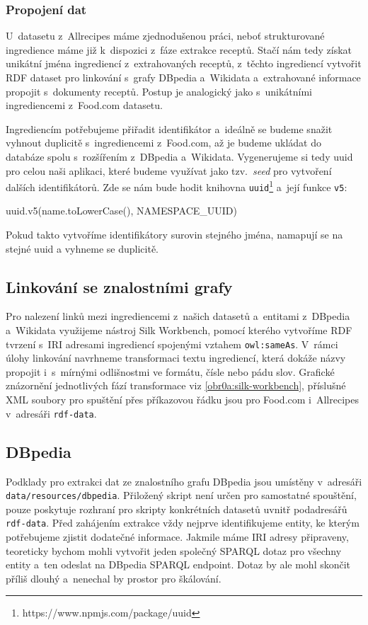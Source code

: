 \subsubsection{Propojení dat}

U~datasetu z~Allrecipes máme zjednodušenou práci, neboť strukturované ingredience máme již k~dispozici z~fáze extrakce receptů. Stačí nám tedy získat unikátní jména ingrediencí z~extrahovaných receptů, z~těchto ingrediencí vytvořit RDF dataset pro linkování s~grafy DBpedia a~Wikidata a~extrahované informace propojit s~dokumenty receptů. Postup je analogický jako s~unikátními ingrediencemi z~Food.com datasetu. 

Ingrediencím potřebujeme přiřadit identifikátor a~ideálně se budeme snažit vyhnout duplicitě s~ingrediencemi z~Food.com, až je budeme ukládat do databáze spolu s~rozšířením z~DBpedia a~Wikidata. Vygenerujeme si tedy uuid pro celou naši aplikaci, které budeme využívat jako tzv.~\emph{seed} pro vytvoření dalších identifikátorů. Zde se nám bude hodit knihovna \texttt{uuid}\footnote{https://www.npmjs.com/package/uuid} a~její funkce \texttt{v5}:
\begin{code}
uuid.v5(name.toLowerCase(), NAMESPACE_UUID)
\end{code}
Pokud takto vytvoříme identifikátory surovin stejného jména, namapují se na stejné uuid a vyhneme se duplicitě.

\subsection{Linkování se znalostními grafy}

Pro nalezení linků mezi ingrediencemi z~našich datasetů a~entitami z~DBpedia a~Wikidata využijeme nástroj Silk Workbench, pomocí kterého vytvoříme RDF tvrzení s~IRI adresami ingrediencí spojenými vztahem \texttt{owl:sameAs}. V~rámci úlohy linkování navrhneme transformaci textu ingrediencí, která dokáže názvy propojit i~s~mírnými odlišnostmi ve formátu, čísle nebo pádu slov. Grafické znázornění jednotlivých fází transformace viz \ref{obr0a:silk-workbench}, příslušné XML soubory pro spuštění přes příkazovou řádku jsou pro Food.com i~Allrecipes v~adresáři \texttt{rdf-data}.

\subsection{DBpedia}

Podklady pro extrakci dat ze znalostního grafu DBpedia jsou umístěny v~adresáři \texttt{data/resources/dbpedia}. Přiložený skript není určen pro samostatné spouštění, pouze poskytuje rozhraní pro skripty konkrétních datasetů uvnitř podadresářů \texttt{rdf-data}. Před zahájením extrakce vždy nejprve identifikujeme entity, ke kterým potřebujeme zjistit dodatečné informace. Jakmile máme IRI adresy připraveny, teoreticky bychom mohli vytvořit jeden společný SPARQL dotaz pro všechny entity a~ten odeslat na DBpedia SPARQL endpoint. Dotaz by ale mohl skončit příliš dlouhý a~nenechal by prostor pro škálování.

